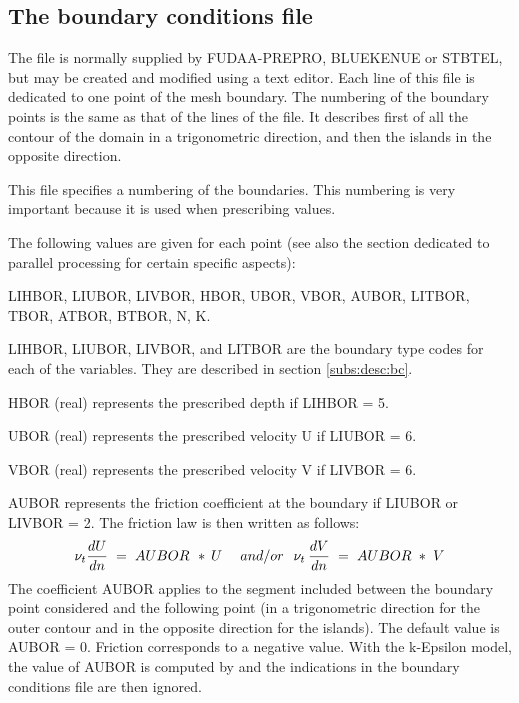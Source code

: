 \subsection{ The boundary conditions file}
\label{sub:bc:file}
 The file is normally supplied by FUDAA-PREPRO, BLUEKENUE or STBTEL, but may be created and modified using a text editor. Each line of this file is dedicated to one point of the mesh boundary. The numbering of the boundary points is the same as that of the lines of the file. It describes first of all the contour of the domain in a trigonometric direction, and then the islands in the opposite direction.

 This file specifies a numbering of the boundaries. This numbering is very important because it is used when prescribing values.

 The following values are given for each point (see also the section dedicated to parallel processing for certain specific aspects):

 LIHBOR, LIUBOR, LIVBOR, HBOR, UBOR, VBOR, AUBOR, LITBOR, TBOR, ATBOR, BTBOR, N, K.

 LIHBOR, LIUBOR, LIVBOR, and LITBOR are the boundary type codes for each of the variables. They are described in section \ref{subs:desc:bc}.

 HBOR (real) represents the prescribed depth if LIHBOR = 5.

 UBOR (real) represents the prescribed velocity U if LIUBOR = 6.

 VBOR (real) represents the prescribed velocity V if LIVBOR = 6.

 AUBOR  represents the friction coefficient at the boundary if LIUBOR or LIVBOR = 2. The friction law is then written as follows:
\[\nu _{t} \frac{dU}{dn} {\kern 1pt} {\kern 1pt} {\kern 1pt} ={\kern 1pt} {\kern 1pt} {\kern 1pt} AUBOR{\kern 1pt} {\kern 1pt} {\kern 1pt} {\kern 1pt} *{\kern 1pt} {\kern 1pt} U{\kern 1pt} {\kern 1pt} {\kern 1pt} {\kern 1pt} {\kern 1pt} {\kern 1pt} {\kern 1pt} {\kern 1pt} {\kern 1pt} {\kern 1pt} {\kern 1pt} {\kern 1pt} {\kern 1pt} and/or{\kern 1pt} {\kern 1pt} {\kern 1pt} {\kern 1pt} {\kern 1pt} {\kern 1pt} {\kern 1pt} \nu _{t} {\kern 1pt} {\kern 1pt} \frac{dV}{dn} {\kern 1pt} {\kern 1pt} {\kern 1pt} ={\kern 1pt} {\kern 1pt} {\kern 1pt} AUBOR{\kern 1pt} {\kern 1pt} {\kern 1pt} *{\kern 1pt} {\kern 1pt} {\kern 1pt} V\]
The coefficient AUBOR applies to the segment included between the boundary point considered and the following point (in a trigonometric direction for the outer contour and in the opposite direction for the islands). The default value is AUBOR = 0. Friction corresponds to a negative value. With the k-Epsilon model, the value of AUBOR is computed by  and the indications in the boundary conditions file are then ignored.

